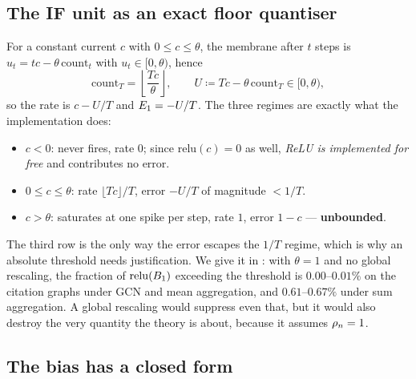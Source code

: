\subsection{The IF unit as an exact floor quantiser}
\label{sec:lemma1}

For a constant current $c$ with $0 \le c \le \theta$, the membrane after $t$ steps is
$u_{t} = tc - \theta\,\mathrm{count}_{t}$ with $u_{t} \in [0,\theta)$, hence
\begin{equation}
\mathrm{count}_{T} = \left\lfloor \frac{Tc}{\theta} \right\rfloor,
\qquad U \coloneqq Tc - \theta\,\mathrm{count}_{T} \in [0,\theta),
\label{eq:floor}
\end{equation}
so the rate is $c - U/T$ and $E_{1} = -U/T$. The three regimes are exactly what
the implementation does:
\begin{itemize}\itemsep1pt
\item $c < 0$: never fires, rate $0$; since $\mathrm{relu}(c) = 0$ as well, \emph{ReLU is implemented
for free} and contributes no error.
\item $0 \le c \le \theta$: rate $\lfloor Tc \rfloor / T$, error $-U/T$ of magnitude $< 1/T$.
\item $c > \theta$: saturates at one spike per step, rate $1$, error $1-c$ --- \textbf{unbounded}.
\end{itemize}
The third row is the only way the error escapes the $1/T$ regime, which is why an absolute threshold
needs justification. We give it in : with $\theta = 1$ and no global rescaling,
the fraction of $\mathrm{relu}(B_{1})$ exceeding the threshold is $0.00$--$0.01\%$ on the citation
graphs under GCN and mean aggregation, and $0.61$--$0.67\%$ under sum aggregation. A global
rescaling would suppress even that, but it would also destroy the very quantity the theory is about,
because it assumes $\rho_{n} = 1$.

\subsection{The bias has a closed form}
\label{sec:bias}

